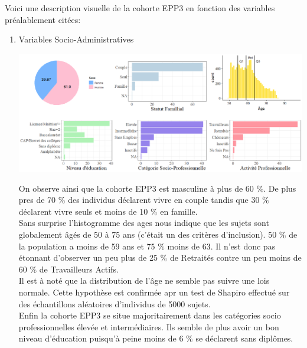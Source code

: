 \documentclass{book}
\begin{document}
Voici une description visuelle de la cohorte EPP3 en fonction des variables préalablement citées:\\

\begin{enumerate}
\item Variables Socio-Administratives
\begin{center}
\includegraphics[scale=.45]{tab_var_socio_ad.png}
\end{center}
On observe ainsi que la cohorte EPP3 est masculine à plus de 60 $\%$. De plus pres de 70 $\%$ des individus déclarent vivre en couple tandis que 30 $\%$  déclarent vivre seuls et moins de 10 $\%$ en famille.\\
Sans surprise l'histogramme des ages nous indique que les sujets sont globalement âgés de 50 à 75 ans (c'était un des critères d'inclusion). 50 $\%$ de la population a moins de 59 ans et 75 $\%$ moins de 63. Il n'est donc pas étonnant d'observer un peu plus de 25 $\%$ de Retraités contre un peu moins de 60 $\%$ de Travailleurs Actifs.\\
Il est à noté que la distribution de l'âge ne semble pas suivre une lois normale. Cette hypothèse est confirmée apr un test de Shapiro effectué sur des échantillons aléatoires d'individus de 5000 sujets.\\
Enfin la cohorte EPP3 se situe majoritairement dans les catégories socio professionnelles élevée et intermédiaires.
Ils semble de plus avoir un bon niveau d'éducation puisqu'à peine moins de 6 $\%$ se déclarent sans diplômes.\\


\end{enumerate}
\end{document}
